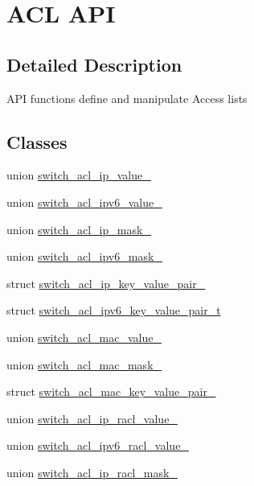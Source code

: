 \hypertarget{group__ACL}{\section{A\+C\+L A\+P\+I}
\label{group__ACL}
}


\subsection{Detailed Description}
A\+P\+I functions define and manipulate Access lists \subsection*{Classes}
\begin{DoxyCompactItemize}
\item 
union \hyperlink{unionswitch__acl__ip__value__}{switch\+\_\+acl\+\_\+ip\+\_\+value\+\_\+}
\item 
union \hyperlink{unionswitch__acl__ipv6__value__}{switch\+\_\+acl\+\_\+ipv6\+\_\+value\+\_\+}
\item 
union \hyperlink{unionswitch__acl__ip__mask__}{switch\+\_\+acl\+\_\+ip\+\_\+mask\+\_\+}
\item 
union \hyperlink{unionswitch__acl__ipv6__mask__}{switch\+\_\+acl\+\_\+ipv6\+\_\+mask\+\_\+}
\item 
struct \hyperlink{structswitch__acl__ip__key__value__pair__}{switch\+\_\+acl\+\_\+ip\+\_\+key\+\_\+value\+\_\+pair\+\_\+}
\item 
struct \hyperlink{structswitch__acl__ipv6__key__value__pair__t}{switch\+\_\+acl\+\_\+ipv6\+\_\+key\+\_\+value\+\_\+pair\+\_\+t}
\item 
union \hyperlink{unionswitch__acl__mac__value__}{switch\+\_\+acl\+\_\+mac\+\_\+value\+\_\+}
\item 
union \hyperlink{unionswitch__acl__mac__mask__}{switch\+\_\+acl\+\_\+mac\+\_\+mask\+\_\+}
\item 
struct \hyperlink{structswitch__acl__mac__key__value__pair__}{switch\+\_\+acl\+\_\+mac\+\_\+key\+\_\+value\+\_\+pair\+\_\+}
\item 
union \hyperlink{unionswitch__acl__ip__racl__value__}{switch\+\_\+acl\+\_\+ip\+\_\+racl\+\_\+value\+\_\+}
\item 
union \hyperlink{unionswitch__acl__ipv6__racl__value__}{switch\+\_\+acl\+\_\+ipv6\+\_\+racl\+\_\+value\+\_\+}
\item 
union \hyperlink{unionswitch__acl__ip__racl__mask__}{switch\+\_\+acl\+\_\+ip\+\_\+racl\+\_\+mask\+\_\+}

\end{DoxyCompactItemize}
